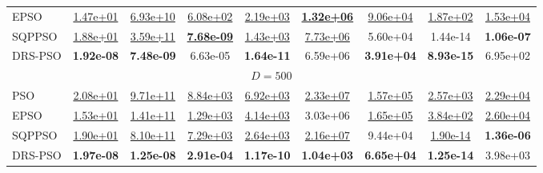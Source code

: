 \begin{table}
\begin{tabular}{lcccccccc}
EPSO & {\underline{1.47e+01}} & {\underline{6.93e+10}} & {\underline{6.08e+02}} & {\underline{2.19e+03}} & \textbf{\underline{1.32e+06}} & {\underline{9.06e+04}} & {\underline{1.87e+02}} & {\underline{1.53e+04}} \\
SQPPSO & {\underline{1.88e+01}} & {\underline{3.59e+11}} & \textbf{\underline{7.68e-09}} & {\underline{1.43e+03}} & {\underline{7.73e+06}} & {5.60e+04} & {1.44e-14} & \textbf{1.06e-07} \\
DRS-PSO & \textbf{1.92e-08} & \textbf{7.48e-09} & {6.63e-05} & \textbf{1.64e-11} & {6.59e+06} & \textbf{3.91e+04} & \textbf{8.93e-15} & {6.95e+02} \\
\midrule\multicolumn{9}{c}{ $D = 500$ }\\ \midrule
PSO & {\underline{2.08e+01}} & {\underline{9.71e+11}} & {\underline{8.84e+03}} & {\underline{6.92e+03}} & {\underline{2.33e+07}} & {\underline{1.57e+05}} & {\underline{2.57e+03}} & {\underline{2.29e+04}} \\
EPSO & {\underline{1.53e+01}} & {\underline{1.41e+11}} & {\underline{1.29e+03}} & {\underline{4.14e+03}} & {3.03e+06} & {\underline{1.65e+05}} & {\underline{3.84e+02}} & {\underline{2.60e+04}} \\
SQPPSO & {\underline{1.90e+01}} & {\underline{8.10e+11}} & {\underline{7.29e+03}} & {\underline{2.64e+03}} & {\underline{2.16e+07}} & {9.44e+04} & {\underline{1.90e-14}} & \textbf{1.36e-06} \\
DRS-PSO & \textbf{1.97e-08} & \textbf{1.25e-08} & \textbf{2.91e-04} & \textbf{1.17e-10} & \textbf{1.04e+03} & \textbf{6.65e+04} & \textbf{1.25e-14} & {3.98e+03} \\
\bottomrule
\end{tabular}
\end{table}